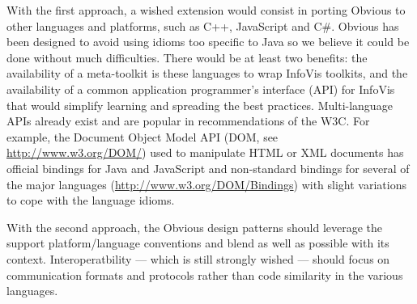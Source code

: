 With the first approach, a wished extension would consist in porting
Obvious to other languages and platforms, such as C++, JavaScript and
C\#.  Obvious has been designed to avoid using idioms too specific to
Java so we believe it could be done without much difficulties.  There
would be at least two benefits: the availability of a meta-toolkit is
these languages to wrap InfoVis toolkits, and the availability of a
common application programmer's interface (API) for InfoVis that would
simplify learning and spreading the best practices.  Multi-language
APIs already exist and are popular in recommendations of the W3C. For
example, the Document Object Model API (DOM, see
\url{http://www.w3.org/DOM/}) used to manipulate HTML or XML documents
has official bindings for Java and JavaScript and non-standard
bindings for several of the major languages
(\url{http://www.w3.org/DOM/Bindings}) with slight variations to cope
with the language idioms.

With the second approach, the Obvious design patterns should leverage
the support platform/language conventions and blend as well as
possible with its context. Interoperatbility --- which is still
strongly wished --- should focus on communication formats and
protocols rather than code similarity in the various languages.


\begin{comment}
This
endeavor raises some new challenges: each language and platforms
supposes some specific idioms that are hardly translatable in concepts
of the other languages. Java has a generic collection type, for
instance, that does not map to a standard equivalent in C++. In
translating the design verbatim from a language to another, we would
insure some level of compatibility, but at the expense of
idiosyncrasies in our library, which would preclude widespread
adoption in our target languages. Conversely, adopting the target
language's idioms would preclude interoperability of the Obvious
platform across languages.
\end{comment}

\begin{comment}

A true test of how generalizable and unifying Obvious would be
post-hoc integration of a new toolkit. IBM ILOG JViews~\cite{JViews}
is one such example being considered. Because it is a commercial
product, this would have the advantage of bringing considerable
exposure to the unification platform.
\end{comment}

